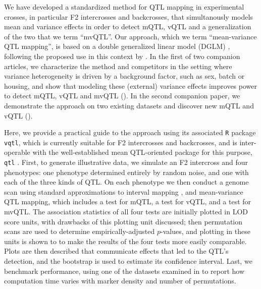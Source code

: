\documentclass[9pt,twocolumn,twoside]{gsag3jnl}
\begin{document}
We have developed a standardized method for QTL mapping in experimental crosses, in particular F2 intercrosses and backcrosses, that simultanously models mean and variance effects in order to detect mQTL, vQTL and a generalization of the two that we term ``mvQTL''.
Our approach, which we term ``mean-variance QTL mapping'', is based on a double generalized linear model (DGLM) \citep{Smyth1989}, following the proposed use in this context by \citet{Ronnegard2011a}.
In the first of two companion articles, we characterize the method and competitors in the setting where variance heterogeneity is driven by a background factor, such as sex, batch or housing, and show that modeling these (external) variance effects improves power to detect mQTL, vQTL and mvQTL (\CortyMethodsPaper). 
In the second companion paper, we demonstrate the approach on two existing datasets and discover new mQTL and vQTL (\CortyReanalysisPaper). 

Here, we provide a practical guide to the approach using its associated \texttt{R} package \texttt{vqtl},
%
%
which is currently suitable for F2 intercrosses and backcrosses, and is inter-operable with the well-established mean QTL-oriented package for this purpose, \texttt{qtl} \citep{Broman2003}.
First, to generate illustrative data, we simulate an F2 intercross and four phenotypes: one phenotype determined entirely by random noise, and one with each of the three kinds of QTL.
On each phenotype we then conduct a genome scan using standard approximations to interval mapping \citep{Lander1989a,Martinez1992}, and mean-variance QTL mapping, which includes a test for mQTL, a test for vQTL, and a test for mvQTL.
The association statistics of all four tests are initially plotted in LOD score units, with drawbacks of this plotting unit discussed; then permutation scans are used to determine empirically-adjusted $p$-values, and plotting in these units is shown to to make the results of the four tests more easily comparable.
Plots are then described that communicate effects that led to the QTL's detection, and the bootstrap is used to estimate its confidence interval.
Last, we benchmark performance, using one of the datasets examined in \CortyReanalysisPaper to report how computation time varies with marker density and number of permutations.
\end{document}
